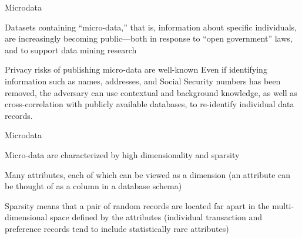 \documentclass[12pt,aspectratio=169,handout]{beamer}
\begin{document}
\begin{frame}{Microdata}


Datasets containing “micro-data,” that is, information about specific individuals, are increasingly becoming public—both in response to “open government” laws, and to support data mining research

\begin{block}{Privacy risks of publishing micro-data are well-known}
Even if identifying information such as names, addresses, and Social Security numbers has been removed, the adversary can use contextual and background knowledge, as well as cross-correlation with publicly available databases, to re-identify individual data records.
\end{block}


\end{frame}


\begin{frame}{Microdata}


Micro-data are characterized by high dimensionality and sparsity

Many attributes, each of which can be viewed as a dimension (an attribute can be thought of as a column in a database schema)

Sparsity means that a pair of random records are located far apart in the multi-dimensional space defined by the attributes (individual transaction and preference records tend to include statistically rare attributes)



\end{frame}
\end{document}
